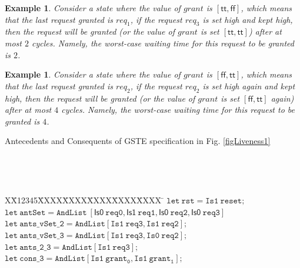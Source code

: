 \documentclass[final]{IEEEtran}
\newtheorem{example}[theorem]{Example}
\newlength{\fminilength}
\newenvironment{fmini}[1][\linewidth]
  {\setlength{\fminilength}{#1\fboxsep-2\fboxrule}%
   \vspace{2ex}\noindent\begin{lrbox}{\fminibox}\begin{minipage}{\fminilength}%
   \mbox{ }\hfill\vspace{-2.5ex}}%
  {\end{minipage}\end{lrbox}\vspace{1ex}\hspace{0ex}%
   \framebox{\usebox{\fminibox}}}
\newenvironment{specification}
{\noindent\footnotesize\tt\begin{fmini}\begin{tabbing}X\=X12345\=XXXX\=XXXX\=XXXX\=XXXX\=XXXX
\=\+\kill} {\end{tabbing}\normalfont\end{fmini}}
\begin{document}
 \begin{example}\label{livenessExample1}
Consider a state where the value of $grant$ is $[\mathsf{tt,ff}]$,
which means that the last request granted is $req_{1}$, if the
request $req_{3}$ is set high and kept high, then the request will
be granted (or the value of $grant$ is set $[\mathsf{tt,tt}]$) after
at most $2$ cycles. Namely, the  worst-case waiting time for
 this request to be granted is $2$.
\end{example}

\begin{example}\label{livenessExample2}
Consider a state where the value of $grant$ is $[\mathsf{ff,tt}]$,
which means that the last request granted is $req_{2}$, if the
request $req_{2}$ is set high again and kept high, then the request will
be granted (or the value of $grant $ is set $[\mathsf{ff,tt}]$
again) after at most $4$ cycles. Namely, the  worst-case waiting
time for
 this request to be granted is $4$.
\end{example}

\vspace{2mm}
\begin{center}
\begin{table}
\caption{Antecedents and Consequents of   GSTE specification in Fig.
\ref{figLiveness1}}
\begin{specification}
$\mathtt{let\ rst = Is1 \  reset  ;}$\\



$\mathtt{let\ antSet= AndList\ [\mathsf{Is0}\ req0, \mathsf{Is1}\
req1,\mathsf{Is0}\ req2,\mathsf{Is0}\ req3]}$ \\

$\mathtt{let\ ants\_vSet\_2 = AndList [Is1\ req3,Is1\ req2];}$\\

 $\mathtt{let\  ants\_vSet\_3 = AndList [Is1\ req3,Is0\ req2 ];}$\\
$\mathtt{let\ ants\_2\_3 = AndList [Is1\ req3 ];
}$\\

 $\mathtt{let\ cons\_3=AndList[Is1 \ grant_0, Is1\ grant_1];}$\\
 \end{specification}

\end{table}
\end{center}
\end{document}

